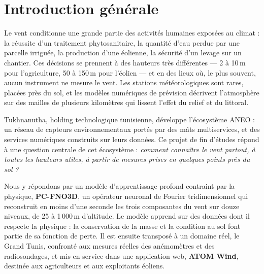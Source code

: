 \chapter*{Introduction générale}

Le vent conditionne une grande partie des activités humaines exposées au climat : la réussite d'un
traitement phytosanitaire, la quantité d'eau perdue par une parcelle irriguée, la production d'une
éolienne, la sécurité d'un levage sur un chantier. Ces décisions se prennent à des hauteurs très
différentes --- 2 à 10\,m pour l'agriculture, 50 à 150\,m pour l'éolien --- et en des lieux où, le
plus souvent, aucun instrument ne mesure le vent. Les stations météorologiques sont rares, placées
près du sol, et les modèles numériques de prévision décrivent l'atmosphère sur des mailles de
plusieurs kilomètres qui lissent l'effet du relief et du littoral.

Tukhnanutha, holding technologique tunisienne, développe l'écosystème ANEO : un réseau de capteurs
environnementaux portés par des mâts multiservices, et des services numériques construits sur leurs
données. Ce projet de fin d'études répond à une question centrale de cet écosystème :
\emph{comment connaître le vent partout, à toutes les hauteurs utiles, à partir de mesures prises
en quelques points près du sol ?}

Nous y répondons par un modèle d'apprentissage profond contraint par la physique,
\textbf{PC-FNO3D}, un opérateur neuronal de Fourier tridimensionnel qui reconstruit en moins d'une
seconde les trois composantes du vent sur douze niveaux, de 25 à 1\,000\,m d'altitude. Le modèle
apprend sur des données dont il respecte la physique : la conservation de la masse et la condition
au sol font partie de sa fonction de perte. Il est ensuite transposé à un domaine réel, le Grand
Tunis, confronté aux mesures réelles des anémomètres et des radiosondages, et mis en service dans
une application web, \textbf{ATOM Wind}, destinée aux agriculteurs et aux exploitants éoliens.

